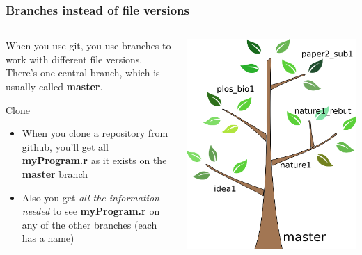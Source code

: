 \documentclass{beamer}
\begin{document}
\begin{frame}
  \frametitle{Branches instead of file versions}
  \begin{columns}[T]
    \begin{column}{.5\textwidth}
      When you use git, you use \alert{branches} to work with
      different file versions. There's one central branch, which
      is usually called \textbf{master}.
      \begin{block}{Clone}
        \begin{itemize}
        \item When you \alert{clone} a repository from github, you'll get all
         \textbf{myProgram.r} as it exists on the \textbf{master} branch

        \item Also you get \emph{all the information needed} to see \textbf{myProgram.r}
          on any of the other branches (each has a name)
        \end{itemize}
      \end{block}
    \end{column}
    \begin{column}{.5\textwidth}
      \includegraphics[width=\textwidth]{tree.png}
    \end{column}
  \end{columns}
\end{frame}
\end{document}
